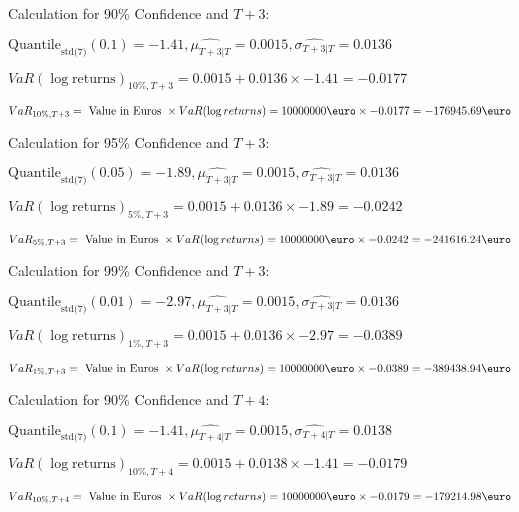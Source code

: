 Calculation for 90\% Confidence and $T+3$:

\indent\indent $\text{Quantile}_\text{std(7)}(0.1) = -1.41,\hat{\mu_{T+3|T}} = 0.0015, \hat{\sigma_{T+3|T}} = 0.0136$

\indent\indent $VaR(\log \text{returns})_{10\%, T + 3} = 0.0015 + 0.0136\times-1.41 = -0.0177$

\indent\indent $VaR_{10\%, T + 3} = \text{ Value in Euros } \times VaR(\log returns) = 10 000 000 \text{\euro} \times-0.0177 = -176945.69 \text{\euro}$\newline




Calculation for 95\% Confidence and $T+3$:

\indent\indent $\text{Quantile}_\text{std(7)}(0.05) = -1.89,\hat{\mu_{T+3|T}} = 0.0015, \hat{\sigma_{T+3|T}} = 0.0136$

\indent\indent $VaR(\log \text{returns})_{5\%, T + 3} = 0.0015 + 0.0136\times-1.89 = -0.0242$

\indent\indent $VaR_{5\%, T + 3} = \text{ Value in Euros } \times VaR(\log returns) = 10 000 000 \text{\euro} \times-0.0242 = -241616.24 \text{\euro}$\newline




Calculation for 99\% Confidence and $T+3$:

\indent\indent $\text{Quantile}_\text{std(7)}(0.01) = -2.97,\hat{\mu_{T+3|T}} = 0.0015, \hat{\sigma_{T+3|T}} = 0.0136$

\indent\indent $VaR(\log \text{returns})_{1\%, T + 3} = 0.0015 + 0.0136\times-2.97 = -0.0389$

\indent\indent $VaR_{1\%, T + 3} = \text{ Value in Euros } \times VaR(\log returns) = 10 000 000 \text{\euro} \times-0.0389 = -389438.94 \text{\euro}$\newline




Calculation for 90\% Confidence and $T+4$:

\indent\indent $\text{Quantile}_\text{std(7)}(0.1) = -1.41,\hat{\mu_{T+4|T}} = 0.0015, \hat{\sigma_{T+4|T}} = 0.0138$

\indent\indent $VaR(\log \text{returns})_{10\%, T + 4} = 0.0015 + 0.0138\times-1.41 = -0.0179$

\indent\indent $VaR_{10\%, T + 4} = \text{ Value in Euros } \times VaR(\log returns) = 10 000 000 \text{\euro} \times-0.0179 = -179214.98 \text{\euro}$\newline





